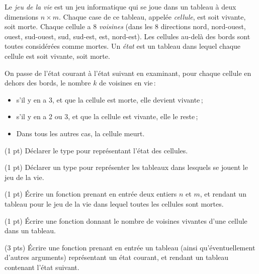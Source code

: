 



Le \emph{jeu de la vie} est un jeu informatique qui se joue dans un
tableau {\`a} deux dimensions $n\times m$. Chaque case de ce tableau,
appel{\'e}e \emph{cellule}, est soit vivante, soit morte. Chaque cellule a
8 \emph{voisines} (dans les 8 directions nord, nord-ouest, ouest,
sud-ouest, sud, sud-est, est, nord-est). Les cellules au-del{\`a} des
bords sont toutes consid{\'e}r{\'e}es comme mortes. Un \emph{{\'e}tat} est un
tableau dans lequel chaque cellule est soit vivante, soit morte.

On passe de l'{\'e}tat courant {\`a} l'{\'e}tat suivant en examinant, pour
chaque cellule en dehors des bords, le nombre $k$ de voisines en
vie\,:
\begin{itemize}
\item s'il y en a 3, et que la cellule est morte, elle devient vivante\,;
\item s'il y en a 2 ou 3, et que la cellule est vivante, elle le reste\,;
\item Dans tous les autres cas, la cellule meurt.
\end{itemize}


\question (1 pt) D{\'e}clarer le type pour repr{\'e}sentant l'{\'e}tat des
cellules.

\question (1 pt) D{\'e}clarer un type pour repr{\'e}senter les tableaux dans
lesquels se jouent le jeu de la vie.

\question (1 pt) {\'E}crire un fonction prenant en entr{\'e}e deux entiers $n$
et $m$, et rendant un tableau pour le jeu de la vie dans lequel toutes
les cellules sont mortes.

\question (1 pt) {\'E}crire une fonction donnant le nombre de voisines
vivantes d'une cellule dans un tableau.


\question (3 pts) {\'E}crire une fonction prenant en entr{\'e}e un tableau
(ainsi qu'{\'e}ventuellement d'autres arguments) repr{\'e}sentant un {\'e}tat
courant, et rendant un tableau contenant l'{\'e}tat suivant.

